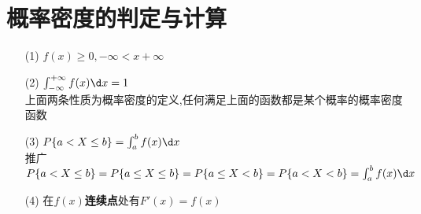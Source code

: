 \documentclass[12pt, a4paper, oneside, UTF8]{ctexbook}
\begin{document}
\section{概率密度的判定与计算}
\begin{remark}[概率密度的性质]
    \begin{enumerate}
    \item [(1)] $f(x)\geq 0, -\infty < x +\infty$ 
    \item [(2)] $\int_{-\infty}^{+\infty}f(x)\d x = 1$ \\
    上面两条性质为概率密度的定义,任何满足上面的函数都是某个概率的概率密度函数 
    \item [(3)] $P\{a<X\leq b\}=\int_{a}^{b}f(x)\d x$ \\
    推广$P\{a<X\leq b\}=P\{a\leq X\leq b\}=P\{a\leq X < b\} = P\{a<X <  b\} =\int_{a}^{b}f(x)\d x$ 
    \item [(4)] 在$f(x)$\textbf{连续点}处有$F'(x)=f(x)$ 
    \end{enumerate}
\end{remark}
\end{document}

